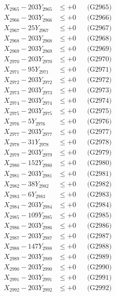 \documentclass[a4paper,10pt]{article}
\begin{document}
{\begin{align}
X_{2965} - 203Y_{2965} &\leq +0 && \text{(G2965)} \\
X_{2966} - 203Y_{2966} &\leq +0 && \text{(G2966)} \\
X_{2967} - 25Y_{2967} &\leq +0 && \text{(G2967)} \\
X_{2968} - 203Y_{2968} &\leq +0 && \text{(G2968)} \\
X_{2969} - 203Y_{2969} &\leq +0 && \text{(G2969)} \\
X_{2970} - 203Y_{2970} &\leq +0 && \text{(G2970)} \\
\allowbreak
X_{2971} - 95Y_{2971} &\leq +0 && \text{(G2971)} \\
X_{2972} - 203Y_{2972} &\leq +0 && \text{(G2972)} \\
X_{2973} - 203Y_{2973} &\leq +0 && \text{(G2973)} \\
X_{2974} - 203Y_{2974} &\leq +0 && \text{(G2974)} \\
X_{2975} - 203Y_{2975} &\leq +0 && \text{(G2975)} \\
X_{2976} - 5Y_{2976} &\leq +0 && \text{(G2976)} \\
X_{2977} - 203Y_{2977} &\leq +0 && \text{(G2977)} \\
X_{2978} - 31Y_{2978} &\leq +0 && \text{(G2978)} \\
X_{2979} - 203Y_{2979} &\leq +0 && \text{(G2979)} \\
X_{2980} - 152Y_{2980} &\leq +0 && \text{(G2980)} \\
\allowbreak
X_{2981} - 203Y_{2981} &\leq +0 && \text{(G2981)} \\
X_{2982} - 38Y_{2982} &\leq +0 && \text{(G2982)} \\
X_{2983} - 6Y_{2983} &\leq +0 && \text{(G2983)} \\
X_{2984} - 203Y_{2984} &\leq +0 && \text{(G2984)} \\
X_{2985} - 109Y_{2985} &\leq +0 && \text{(G2985)} \\
X_{2986} - 203Y_{2986} &\leq +0 && \text{(G2986)} \\
X_{2987} - 203Y_{2987} &\leq +0 && \text{(G2987)} \\
X_{2988} - 147Y_{2988} &\leq +0 && \text{(G2988)} \\
X_{2989} - 203Y_{2989} &\leq +0 && \text{(G2989)} \\
X_{2990} - 203Y_{2990} &\leq +0 && \text{(G2990)} \\
\allowbreak
X_{2991} - 203Y_{2991} &\leq +0 && \text{(G2991)} \\
X_{2992} - 203Y_{2992} &\leq +0 && \text{(G2992)} \\

\end{align}}
\end{document}
